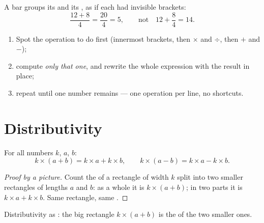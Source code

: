 \begin{remark}
A  bar groups its  and its , as if each
had invisible brackets:
\[
\frac{12 + 8}{4} = \frac{20}{4} = 5,
\qquad\text{not}\quad 12 + \frac{8}{4} = 14 .
\]
\end{remark}

\begin{method}\label{met:g7:priorities:safe}
\begin{enumerate}
  \item Spot the operation to do first (innermost brackets, then
        $\times$ and $\div$, then $+$ and $-$);
  \item compute \emph{only that one}, and rewrite the whole expression
        with the result in place;
  \item repeat until one number remains --- one operation per line, no
        shortcuts.
\end{enumerate}
\end{method}

\section{Distributivity}

\begin{theorem}[Distributivity]\label{thm:g7:priorities:distributivity}
For all numbers $k$, $a$, $b$:
\[
k \times (a + b) = k \times a + k \times b,
\qquad
k \times (a - b) = k \times a - k \times b .
\]
\end{theorem}

\begin{proof}[Proof by a picture]
Count the  of a rectangle of width $k$ split into two smaller
rectangles of lengths $a$ and $b$: as a whole it is $k \times (a+b)$;
in two parts it is $k \times a + k \times b$. Same rectangle, same
.
\end{proof}

\begin{omfigure}

{\small Distributivity as : the big rectangle
$k \times (a + b)$ is the  of the two smaller ones.}
\end{omfigure}

